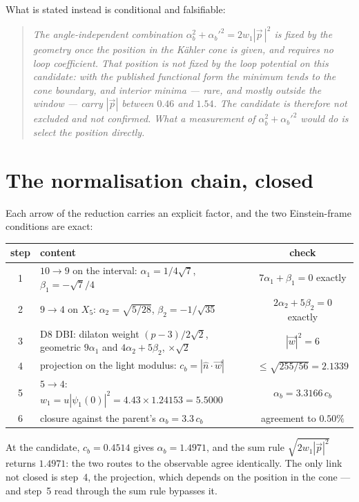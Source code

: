 What is stated instead is conditional and falsifiable:
\begin{quote}\emph{The angle-independent combination $\alpha_b^2+\alpha_b'^2=2w_1|\vec p\,|^2$ is fixed by the geometry once the position in the K\"ahler cone is given, and requires no loop coefficient. That position is not fixed by the loop potential on this candidate: with the published functional form the minimum tends to the cone boundary, and interior minima --- rare, and mostly outside the window --- carry $|\vec p|$ between $0.46$ and $1.54$. The candidate is therefore not excluded and not confirmed. What a measurement of $\alpha_b^2+\alpha_b'^2$ would do is select the position directly.}\end{quote}

\section{The normalisation chain, closed}
Each arrow of the reduction carries an explicit factor, and the two Einstein-frame conditions are exact:
\begin{center}\small
\begin{tabular}{clc}\toprule
step & content & check\\\midrule
1 & $10\to9$ on the interval: $\alpha_1=1/4\sqrt7$, $\beta_1=-\sqrt7/4$ & $7\alpha_1+\beta_1=0$ exactly\\
2 & $9\to4$ on $X_5$: $\alpha_2=\sqrt{5/28}$, $\beta_2=-1/\sqrt{35}$ & $2\alpha_2+5\beta_2=0$ exactly\\
3 & D8 DBI: dilaton weight $(p-3)/2\sqrt2$, geometric $9\alpha_1$ and $4\alpha_2+5\beta_2$, $\times\sqrt2$ & $|\vec w|^2=6$\\
4 & projection on the light modulus: $c_b=|\hat n\cdot\vec w|$ & $\leq\sqrt{255/56}=2.1339$\\
5 & $5\to4$: $w_1=u|\psi_1(0)|^2=4.43\times1.24153=5.5000$ & $\alpha_b=3.3166\,c_b$\\
6 & closure against the parent's $\alpha_b=3.3\,c_b$ & agreement to $0.50\%$\\\bottomrule
\end{tabular}
\end{center}
At the candidate, $c_b=0.4514$ gives $\alpha_b=1.4971$, and the sum rule $\sqrt{2w_1|\vec p|^2}$ returns $1.4971$: the two routes to the observable agree identically. The only link not closed is step~4, the projection, which depends on the position in the cone --- and step~5 read through the sum rule bypasses it.

